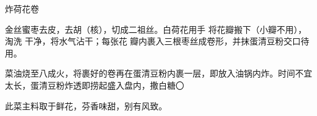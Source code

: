 \begin{recipe}{炸荷花卷}

\ingredients


\preparation

金丝蜜枣去皮，去胡（核），切成二祖丝。白荷花用手 将花瓣搬下（小瓣不用），淘洗
干净，将水气沾干；每张花 瓣内裹入三根枣丝成卷形，并抹蛋清豆粉交口待用。

\step 菜油烧至八成火，将裹好的卷再在蛋清豆粉内裹一层，即放入油锅内炸。时间不宜
太长，蛋清豆粉炸透即捞起盛入盘内，撒白糖〇

\features

此菜主料取于鲜花，芬香味甜，别有风致。

\end{recipe}

